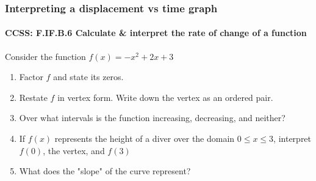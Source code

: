 \documentclass{beamer}
\begin{document}
\frame
{
  \frametitle{Interpreting a displacement vs time graph}
  \framesubtitle{CCSS: F.IF.B.6 Calculate \& interpret the rate of change of a function}

  \begin{block}{Consider the function $f(x)=-x^2+2x+3$}
  \begin{enumerate}
      \item Factor $f$ and state its zeros.
      \item Restate $f$ in vertex form. Write down the vertex as an ordered pair.
      \item Over what intervals is the function increasing, decreasing, and neither?
      \item If $f(x)$ represents the height of a diver over the domain $0 \leq x \leq 3$, interpret $f(0)$, the vertex, and $f(3)$
      \item What does the "slope" of the curve represent?
  \end{enumerate}
  \end{block}
}
\end{document}
